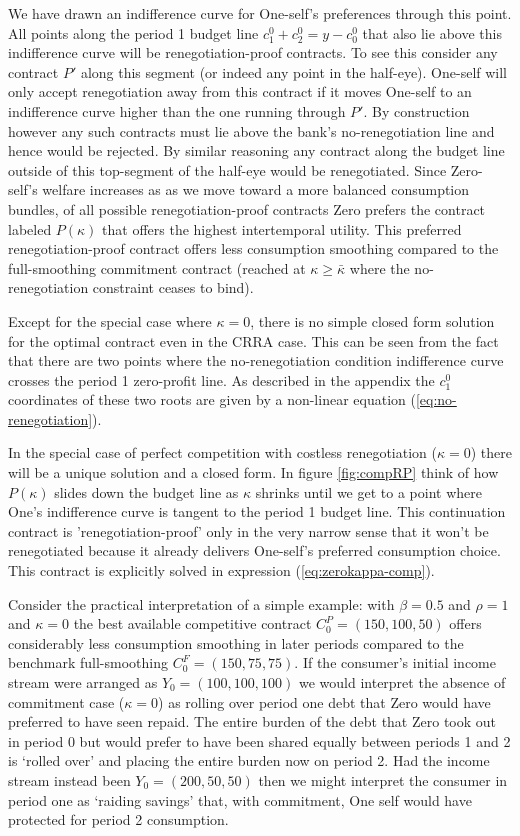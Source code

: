 \documentclass[11pt,english]{article}
\theoremstyle{plain}
\theoremstyle{definition}
\begin{document}
We have drawn an indifference curve for One-self's preferences
through this point. All points along the period 1 budget line $c_{1}^{0}+c_{2}^{0}=y-c_{0}^{0}$
that also lie above this indifference curve will be renegotiation-proof
contracts. To see this consider any contract $P'$ along this segment
(or indeed any point in the half-eye). One-self will only accept renegotiation
away from this contract if it moves One-self to an indifference curve
higher than the one running through $P'$. By construction however
any such contracts must lie above the bank's no-renegotiation line
and hence would be rejected. By similar reasoning any contract along
the budget line outside of this top-segment of the half-eye would
be renegotiated. Since Zero-self's welfare increases as as we move
toward a more balanced consumption bundles, of all possible renegotiation-proof
contracts Zero prefers the contract labeled $P(\kappa)$ that offers
the highest intertemporal utility. This preferred renegotiation-proof
contract offers less consumption smoothing compared to the full-smoothing
commitment contract (reached at $\kappa\ge\bar{\kappa}$ where the
no-renegotiation constraint ceases to bind).


Except for the special case where $\kappa=0$, there is no simple closed form solution for the optimal contract even in
the CRRA case. This can be seen from the fact that there are two points where the no-renegotiation condition indifference curve
crosses the period 1 zero-profit line. As described in the appendix
the $c_{1}^{0}$ coordinates of these two roots
are given by a non-linear equation (\ref{eq:no-renegotiation}).

In the special case of perfect competition with costless renegotiation
($\kappa=0$) there will be a unique solution and a closed form. In figure \ref{fig:compRP} think of how $P(\kappa)$ slides down the budget line as $\kappa$ shrinks until we get to a point where One's
indifference curve is tangent to the period 1 budget line. This
continuation contract is 'renegotiation-proof' only in the very
narrow sense that it won't be renegotiated because it already delivers
One-self's preferred consumption choice. This  contract is explicitly solved in expression (\ref{eq:zerokappa-comp}).

Consider the practical interpretation of a simple example: with $\beta=0.5$ and $\rho=1$ and $\kappa=0$ the best available competitive contract $C_{0}^{P}=(150,100,50)$ offers considerably less consumption
smoothing in later periods compared to the benchmark full-smoothing  $C_{0}^{F}=(150,75,75)$. If the consumer's initial income stream
were arranged as $Y_{0}=(100,100,100)$ we would interpret the absence of commitment case  ($\kappa=0$) as rolling over period one debt that Zero would have preferred to have seen repaid. The entire
burden of the debt that Zero took out in period
0 but would prefer to have been shared equally between periods 1 and 2 is `rolled over' and placing the entire burden now on period 2. Had the income stream
instead been $Y_{0}=(200,50,50)$ then we might interpret the consumer in period one as `raiding savings' that, with commitment,   One self would have protected for period 2 consumption.
\end{document}
